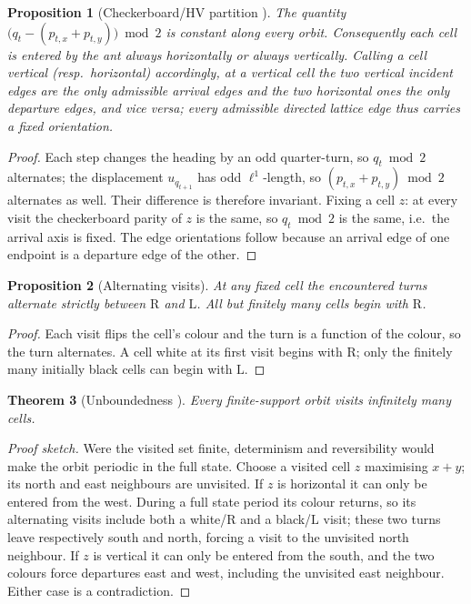 \documentclass[11pt,letterpaper]{article}
\theoremstyle{plain}
\newtheorem{theorem}{Theorem}[section]
\newtheorem{proposition}[theorem]{Proposition}
\theoremstyle{definition}
\newcommand{\turnR}{\mathrm{R}}
\newcommand{\turnL}{\mathrm{L}}
\begin{document}
\begin{NoHyper}
\begin{proposition}[Checkerboard/HV partition {\cite{GaleProppSutnerTroubetzkoy1995}}]
\label{prop:hv}
The quantity $\bigl(q_t-(p_{t,x}+p_{t,y})\bigr)\bmod 2$ is constant along every
orbit. Consequently each cell is entered by the ant always horizontally or always
vertically. Calling a cell \emph{vertical} (resp.\ \emph{horizontal}) accordingly,
at a vertical cell the two vertical incident edges are the only admissible arrival
edges and the two horizontal ones the only departure edges, and vice versa; every
admissible directed lattice edge thus carries a fixed orientation.
\end{proposition}

\begin{proof}
Each step changes the heading by an odd quarter-turn, so $q_t\bmod2$ alternates;
the displacement $u_{q_{t+1}}$ has odd $\ell^1$-length, so $(p_{t,x}+p_{t,y})\bmod2$
alternates as well. Their difference is therefore invariant. Fixing a cell $z$: at
every visit the checkerboard parity of $z$ is the same, so $q_t\bmod2$ is the same,
i.e.\ the arrival axis is fixed. The edge orientations follow because an arrival
edge of one endpoint is a departure edge of the other.
\end{proof}

\begin{proposition}[Alternating visits]\label{prop:alt}
At any fixed cell the encountered turns alternate strictly between $\turnR$ and
$\turnL$. All but finitely many cells begin with $\turnR$.
\end{proposition}

\begin{proof}
Each visit flips the cell's colour and the turn is a function of the colour, so the
turn alternates. A cell white at its first visit begins with $\turnR$; only the
finitely many initially black cells can begin with $\turnL$.
\end{proof}

\begin{theorem}[Unboundedness {\cite{BunimovichTroubetzkoy1992}}]\label{thm:unbounded}
Every finite-support orbit visits infinitely many cells.
\end{theorem}

\begin{proof}[Proof sketch]
Were the visited set finite, determinism and reversibility would make the orbit
periodic in the full state. Choose a visited cell $z$ maximising $x+y$; its north and
east neighbours are unvisited. If $z$ is horizontal it can only be entered from the
west. During a full state period its colour returns, so its alternating visits include
both a white/$\turnR$ and a black/$\turnL$ visit; these two turns leave respectively
south and north, forcing a visit to the unvisited north neighbour. If $z$ is vertical
it can only be entered from the south, and the two colours force departures east and
west, including the unvisited east neighbour. Either case is a contradiction.
\end{proof}


\end{NoHyper}
\end{document}
